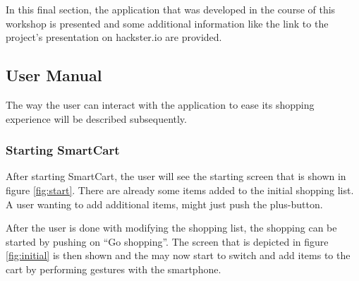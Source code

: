 In this final section, the application that was developed in the course of this
workshop is presented and some additional information like the link to the
project's presentation on hackster.io are provided.

\subsection{User Manual}
The way the user can interact with the application to
ease its shopping experience will be described subsequently.

\subsubsection{Starting SmartCart}
After starting SmartCart, the user will see the starting screen that is shown in
figure \ref{fig:start}. There are already some items added to
the initial shopping list. A user wanting to add additional items, might just
push the plus-button. 

After the user is done with modifying the shopping list, the shopping can
be started by pushing on ``Go shopping''.
The screen that is depicted in figure \ref{fig:initial} is then shown and
the may now start to switch and add items to the cart by performing gestures
with the smartphone.


